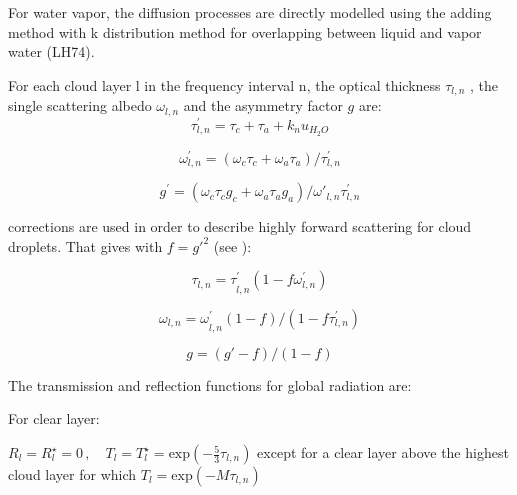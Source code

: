 For water vapor, the diffusion processes are directly modelled using the
adding method with k distribution method for overlapping between liquid and
vapor water (LH74).

For each cloud layer l in the frequency interval n, the optical thickness $\tau
_{l,n}$ , the single scattering albedo $\omega_{l,n}$ and the asymmetry
factor $g$ are:
\begin{equation}
\tau_{l,n}^{'}=\tau_{c}+\tau_{a}+k_{n}u_{H_{2}O}
\end{equation}

\begin{equation}
\omega_{l,n}^{'}=(\omega_{c}\tau_{c}+\omega_{a}\tau_{a})/\tau
_{l,n}^{'}
\end{equation}

\begin{equation}
g^{'}=(\omega_{c}\tau_{c}g_{c}+\omega_{a}\tau_{a}g_{a})/{\omega
'}_{l,n}\tau_{l,n}^{'}
\end{equation}

\cite{Joseph:1976} corrections are used in order to describe highly forward
scattering for cloud droplets. That gives with $f=g'^{2}$ (see \cite{Stephens:1984}):

\begin{equation}
{\tau_{l,n}=\tau }_{l,n}^{'}(1-f\omega_{l,n}^{'})
\end{equation}

\begin{equation}
{\omega_{l,n}=\omega }_{l,n}^{'}(1-f)/(1-f\tau_{l,n}^{'})
\end{equation}

\begin{equation}
g=(g'-f)/(1-f)
\end{equation}

The transmission and reflection functions for global radiation are:

For clear layer:

$R_{l}=R_{l}^{\star }=0\, ,
\quad
T_{l}=T_{l}^{\star }=\mathrm{exp}(-\frac{5}{3}\tau_{l,n})$ except for a
clear layer above the highest cloud layer for which
$T_{l}=\mathrm{exp}(-M\tau_{l,n})$

